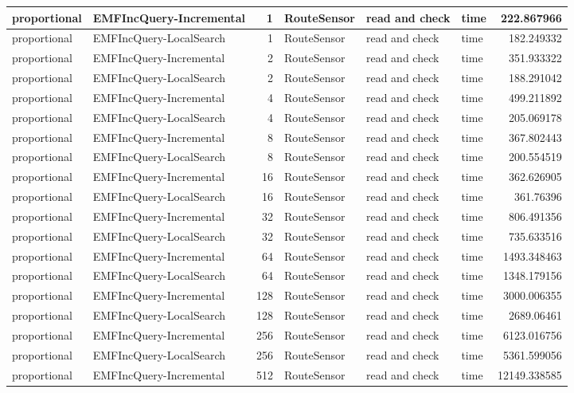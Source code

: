\begin{table}
\begin{tabular}{| l | l | r | l | l | l | r |}
proportional & EMFIncQuery-Incremental & 1 & RouteSensor & read and check & time & 222.867966\\\hline
proportional & EMFIncQuery-LocalSearch & 1 & RouteSensor & read and check & time & 182.249332\\\hline
proportional & EMFIncQuery-Incremental & 2 & RouteSensor & read and check & time & 351.933322\\\hline
proportional & EMFIncQuery-LocalSearch & 2 & RouteSensor & read and check & time & 188.291042\\\hline
proportional & EMFIncQuery-Incremental & 4 & RouteSensor & read and check & time & 499.211892\\\hline
proportional & EMFIncQuery-LocalSearch & 4 & RouteSensor & read and check & time & 205.069178\\\hline
proportional & EMFIncQuery-Incremental & 8 & RouteSensor & read and check & time & 367.802443\\\hline
proportional & EMFIncQuery-LocalSearch & 8 & RouteSensor & read and check & time & 200.554519\\\hline
proportional & EMFIncQuery-Incremental & 16 & RouteSensor & read and check & time & 362.626905\\\hline
proportional & EMFIncQuery-LocalSearch & 16 & RouteSensor & read and check & time & 361.76396\\\hline
proportional & EMFIncQuery-Incremental & 32 & RouteSensor & read and check & time & 806.491356\\\hline
proportional & EMFIncQuery-LocalSearch & 32 & RouteSensor & read and check & time & 735.633516\\\hline
proportional & EMFIncQuery-Incremental & 64 & RouteSensor & read and check & time & 1493.348463\\\hline
proportional & EMFIncQuery-LocalSearch & 64 & RouteSensor & read and check & time & 1348.179156\\\hline
proportional & EMFIncQuery-Incremental & 128 & RouteSensor & read and check & time & 3000.006355\\\hline
proportional & EMFIncQuery-LocalSearch & 128 & RouteSensor & read and check & time & 2689.06461\\\hline
proportional & EMFIncQuery-Incremental & 256 & RouteSensor & read and check & time & 6123.016756\\\hline
proportional & EMFIncQuery-LocalSearch & 256 & RouteSensor & read and check & time & 5361.599056\\\hline
proportional & EMFIncQuery-Incremental & 512 & RouteSensor & read and check & time & 12149.338585\\\hline

\end{tabular}
\end{table}
